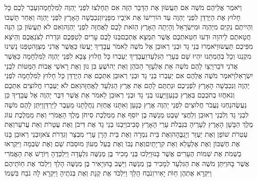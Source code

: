 \documentclass[../main/main.tex]{subfiles}
\begin{document}
\begin{multicols*}{\ncols}
וַיֹּאמֶר אֲלֵיהֶם מֹשֶׁה אִם תַּעֲשׂוּן אֶת הַדָּבָר הַזֶּה אִם תֵּחָלְצוּ לִפְנֵי יַהְוֶה לַמִּלְחָמָה\PreVerseSpace{}וְעָבַר לָכֶם כָּל חָלוּץ אֶת הַיַּרְדֵּן לִפְנֵי יַהְוֶה עַד הוֹרִישׁוֹ אֶת אֹיְבָיו מִפָּנָיו\PreVerseSpace{}וְנִכְבְּשָׁה הָאָרֶץ לִפְנֵי יַהְוֶה וְאַחַר תָּשֻׁבוּ וִהְיִיתֶם נְקִיִּם מִיַּהְוֶה וּמִיִּשְׂרָאֵל וְהָיְתָה הָאָרֶץ הַזֹּאת לָכֶם לַאֲחֻזָּה לִפְנֵי יַהְוֶה\PreVerseSpace{}וְאִם לֹא תַעֲשׂוּן כֵּן הִנֵּה חֲטָאתֶם לַיהוָה וּדְעוּ חַטַּאתְכֶם אֲשֶׁר תִּמְצָא אֶתְכֶם\PreVerseSpace{}בְּנוּ לָכֶם עָרִים לְטַפְּכֶם וּגְדֵרֹת לְצֹנַאֲכֶם וְהַיֹּצֵא מִפִּיכֶם תַּעֲשׂוּ\PreVerseSpace{}וַיֹּאמְרוּ\SubEnd{} בְּנֵי גָד וּבְנֵי רְאוּבֵן אֶל מֹשֶׁה לֵאמֹר עֲבָדֶיךָ יַעֲשׂוּ כַּאֲשֶׁר אֲדֹנִי מְצַוֶּה\PreVerseSpace{}טַפֵּנוּ נָשֵׁינוּ מִקְנֵנוּ וְכָל בְּהֶמְתֵּנוּ יִהְיוּ שָׁם בְּעָרֵי הַגִּלְעָד\PreVerseSpace{}וַעֲבָדֶיךָ יַעַבְרוּ כָּל חֲלוּץ צָבָא לִפְנֵי יַהְוֶה לַמִּלְחָמָה כַּאֲשֶׁר אֲדֹנִי דֹּבֵר\PreVerseSpace{}וַיְצַו לָהֶם מֹשֶׁה אֵת אֶלְעָזָר הַכֹּהֵן וְאֵת יְהוֹשֻׁעַ בִּן נוּן וְאֶת רָאשֵׁי אֲבוֹת הַמַּטּוֹת לִבְנֵי יִשְׂרָאֵל\PreVerseSpace{}וַיֹּאמֶר מֹשֶׁה אֲלֵהֶם אִם יַעַבְרוּ בְנֵי גָד וּבְנֵי רְאוּבֵן אִתְּכֶם אֶת הַיַּרְדֵּן כָּל חָלוּץ לַמִּלְחָמָה לִפְנֵי יַהְוֶה וְנִכְבְּשָׁה הָאָרֶץ לִפְנֵיכֶם וּנְתַתֶּם לָהֶם אֶת אֶרֶץ הַגִּלְעָד לַאֲחֻזָּה\PreVerseSpace{}וְאִם לֹא יַעַבְרוּ חֲלוּצִים אִתְּכֶם וְנֹאחֲזוּ בְתֹכְכֶם בְּאֶרֶץ כְּנָעַן\PreVerseSpace{}וַיַּעֲנוּ בְנֵי גָד וּבְנֵי רְאוּבֵן לֵאמֹר אֵת אֲשֶׁר דִּבֶּר יַהְוֶה אֶל עֲבָדֶיךָ כֵּן נַעֲשֶׂה\PreVerseSpace{}נַחְנוּ נַעֲבֹר חֲלוּצִים לִפְנֵי יַהְוֶה אֶרֶץ כְּנָעַן וְאִתָּנוּ אֲחֻזַּת נַחֲלָתֵנוּ מֵעֵבֶר לַיַּרְדֵּן\PreVerseSpace{}וַיִּתֵּן לָהֶם מֹשֶׁה לִבְנֵי גָד וְלִבְנֵי רְאוּבֵן וְלַחֲצִי שֵׁבֶט מְנַשֶּׁה בֶן יוֹסֵף אֶת מַמְלֶכֶת סִיחֹן מֶלֶךְ הָאֱמֹרִי וְאֶת מַמְלֶכֶת עוֹג מֶלֶךְ הַבָּשָׁן הָאָרֶץ לְעָרֶיהָ בִּגְבֻלֹת עָרֵי הָאָרֶץ סָבִיב\PreVerseSpace{}וַיִּבְנוּ בְנֵי גָד אֶת דִּיבֹן וְאֶת עֲטָרֹת וְאֵת עֲרֹעֵר\PreVerseSpace{}וְאֶת עַטְרֹת שׁוֹפָן וְאֶת יַעְזֵר וְיָגְבֳּהָה\PreVerseSpace{}וְאֶת בֵּית נִמְרָה וְאֶת בֵּית הָרָן עָרֵי מִבְצָר וְגִדְרֹת צֹאן\PreVerseSpace{}וּבְנֵי רְאוּבֵן בָּנוּ אֶת חֶשְׁבּוֹן וְאֶת אֶלְעָלֵא וְאֵת קִרְיָתָיִם\PreVerseSpace{}וְאֶת נְבוֹ וְאֶת בַּעַל מְעוֹן מוּסַבֹּת שֵׁם וְאֶת שִׂבְמָה וַיִּקְרְאוּ בְשֵׁמֹת אֶת שְׁמוֹת הֶעָרִים אֲשֶׁר בָּנוּ\PreVerseSpace{}וַיֵּלְכוּ בְּנֵי מָכִיר בֶּן מְנַשֶּׁה גִּלְעָדָה וַיִּלְכְּדֻהָ וַיּוֹרֶשׁ אֶת הָאֱמֹרִי אֲשֶׁר בָּהּ\PreVerseSpace{}וַיִּתֵּן מֹשֶׁה אֶת הַגִּלְעָד לְמָכִיר בֶּן מְנַשֶּׁה וַיֵּשֶׁב בָּהּ\PreVerseSpace{}וְיָאִיר בֶּן מְנַשֶּׁה הָלַךְ וַיִּלְכֹּד אֶת חַוֺּתֵיהֶם וַיִּקְרָא אֶתְהֶן חַוֺּת יָאִיר\PreVerseSpace{}וְנֹבַח הָלַךְ וַיִּלְכֹּד אֶת קְנָת וְאֶת בְּנֹתֶיהָ וַיִּקְרָא לָה נֹבַח בִּשְׁמוֹ\OpenSection{}\par

\end{multicols*}
\end{document}
